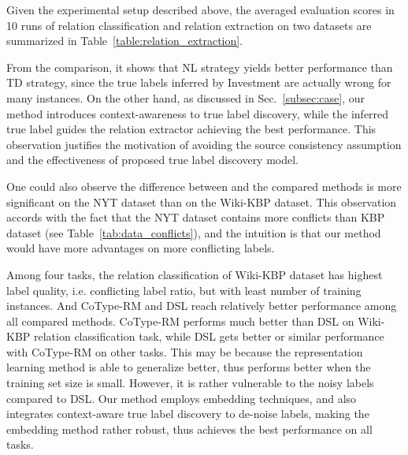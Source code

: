 % 
Given the experimental setup described above, the averaged evaluation scores in 10 runs of relation classification and relation extraction on two datasets are summarized in Table~\ref{table:relation_extraction}.

From the comparison, it shows that NL strategy yields better performance than TD strategy, since the true labels inferred by Investment are actually wrong for many instances. 
On the other hand, as discussed in Sec.~\ref{subsec:case}, our method introduces context-awareness to true label discovery, while the inferred true label guides the relation extractor achieving the best performance. 
This observation justifies the motivation of avoiding the source consistency assumption and the effectiveness of proposed true label discovery model.

One could also observe the difference between \our and the compared methods is more significant on the NYT dataset than on the Wiki-KBP dataset. This observation accords with the fact that the NYT dataset contains more conflicts than KBP dataset (see Table~\ref{tab:data_conflicts}), and the intuition is that our method would have more advantages on more conflicting labels.


Among four tasks, the relation classification of Wiki-KBP dataset has highest label quality, i.e. conflicting label ratio, but with least number of training instances.
And CoType-RM and DSL reach relatively better performance among all compared methods.
CoType-RM performs much better than DSL on Wiki-KBP relation classification task, while DSL gets better or similar performance with CoType-RM on other tasks. 
This may be because the representation learning method is able to generalize better, thus performs better when the training set size is small. 
However, it is rather vulnerable to the noisy labels compared to DSL. 
Our method employs embedding techniques, and also integrates context-aware true label discovery to de-noise labels, making the embedding method rather robust, thus achieves the best performance on all tasks.

